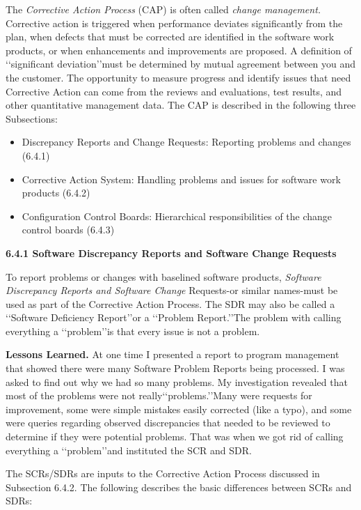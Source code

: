 \documentclass[8pt,twocolumn]{amsart}
\theoremstyle{plain}
\begin{document}
The {\em Corrective Action Process} (CAP) is often called {\em change management.} Corrective action is triggered when performance deviates significantly from the plan, when defects that must be corrected are identified in the software work products, or when enhancements and improvements are proposed. A definition of \lq\lq significant deviation\rq\rq must be determined by mutual agreement between you and the customer. The opportunity to measure progress and identify issues that need Corrective Action can come from the reviews and evaluations, test results, and other quantitative management data. The CAP is described in the following three Subsections:
\begin{itemize}
\item Discrepancy Reports and Change Requests: Reporting problems and changes (6.4.1)
\item Corrective Action System: Handling problems and issues for software work products (6.4.2)
\item Configuration Control Boards: Hierarchical responsibilities of the change control boards (6.4.3)
\end{itemize}

{\bf 6.4.1 Software Discrepancy Reports and Software Change Requests}

To report problems or changes with baselined software products, {\em Software Discrepancy Reports and Software Change} Requests-or similar names-must be used as part of the Corrective Action Process. The SDR may also be called a \lq\lq Software Deficiency Report\rq\rq or a \lq\lq Problem Report.\rq\rq The problem with calling everything a \lq\lq problem\rq\rq is that every issue is not a problem.

{\bf Lessons Learned.} At one time I presented a report to program management that showed there were many Software Problem Reports being processed. I was asked to find out why we had so many problems. My investigation revealed that most of the problems were not really\lq\lq problems.\rq\rq Many were requests for improvement, some were simple mistakes easily corrected (like a typo), and some were queries regarding observed discrepancies that needed to be reviewed to determine if they were potential problems. That was when we got rid of calling everything a \lq\lq problem\rq\rq and instituted the SCR and SDR.

The SCRs/SDRs are inputs to the Corrective Action Process discussed in Subsection 6.4.2. The following describes the basic differences between SCRs and SDRs:
\end{document}
